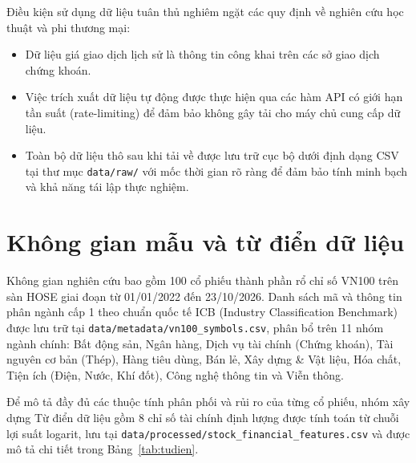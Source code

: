 \documentclass[12pt,a4paper,oneside,openany]{report}
\begin{document}
Điều kiện sử dụng dữ liệu tuân thủ nghiêm ngặt các quy định về nghiên cứu học thuật và phi thương mại:
\begin{itemize}
  \item Dữ liệu giá giao dịch lịch sử là thông tin công khai trên các sở giao dịch chứng khoán.
  \item Việc trích xuất dữ liệu tự động được thực hiện qua các hàm API có giới hạn tần suất (rate-limiting) để đảm bảo không gây tải cho máy chủ cung cấp dữ liệu.
  \item Toàn bộ dữ liệu thô sau khi tải về được lưu trữ cục bộ dưới định dạng CSV tại thư mục \texttt{data/raw/} với mốc thời gian rõ ràng để đảm bảo tính minh bạch và khả năng tái lập thực nghiệm.
\end{itemize}

\section{Không gian mẫu và từ điển dữ liệu}
Không gian nghiên cứu bao gồm 100 cổ phiếu thành phần rổ chỉ số VN100 trên sàn HOSE giai đoạn từ 01/01/2022 đến 23/10/2026. Danh sách mã và thông tin phân ngành cấp 1 theo chuẩn quốc tế ICB (Industry Classification Benchmark) được lưu trữ tại \texttt{data/metadata/vn100\_symbols.csv}, phân bổ trên 11 nhóm ngành chính: Bất động sản, Ngân hàng, Dịch vụ tài chính (Chứng khoán), Tài nguyên cơ bản (Thép), Hàng tiêu dùng, Bán lẻ, Xây dựng \& Vật liệu, Hóa chất, Tiện ích (Điện, Nước, Khí đốt), Công nghệ thông tin và Viễn thông.

Để mô tả đầy đủ các thuộc tính phân phối và rủi ro của từng cổ phiếu, nhóm xây dựng Từ điển dữ liệu gồm 8 chỉ số tài chính định lượng được tính toán từ chuỗi lợi suất logarit, lưu tại \texttt{data/processed/stock\_financial\_features.csv} và được mô tả chi tiết trong Bảng~\ref{tab:tudien}.
\end{document}
